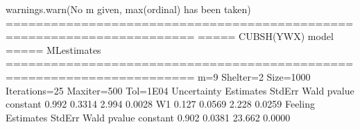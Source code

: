 \documentclass[letterpaper,10pt,english]{sphinxmanual}
\begin{document}
\begin{sphinxVerbatim}[commandchars=\\\{\}]
warnings.warn(\PYGZdq{}No m given, max(ordinal) has been taken\PYGZdq{})
=======================================================================
=====\PYGZgt{}\PYGZgt{}\PYGZgt{} CUBSH(YWX) model \PYGZlt{}\PYGZlt{}\PYGZlt{}===== ML\PYGZhy{}estimates
=======================================================================
m=9  Shelter=2  Size=1000  Iterations=25  Maxiter=500  Tol=1E\PYGZhy{}04
\PYGZhy{}\PYGZhy{}\PYGZhy{}\PYGZhy{}\PYGZhy{}\PYGZhy{}\PYGZhy{}\PYGZhy{}\PYGZhy{}\PYGZhy{}\PYGZhy{}\PYGZhy{}\PYGZhy{}\PYGZhy{}\PYGZhy{}\PYGZhy{}\PYGZhy{}\PYGZhy{}\PYGZhy{}\PYGZhy{}\PYGZhy{}\PYGZhy{}\PYGZhy{}\PYGZhy{}\PYGZhy{}\PYGZhy{}\PYGZhy{}\PYGZhy{}\PYGZhy{}\PYGZhy{}\PYGZhy{}\PYGZhy{}\PYGZhy{}\PYGZhy{}\PYGZhy{}\PYGZhy{}\PYGZhy{}\PYGZhy{}\PYGZhy{}\PYGZhy{}\PYGZhy{}\PYGZhy{}\PYGZhy{}\PYGZhy{}\PYGZhy{}\PYGZhy{}\PYGZhy{}\PYGZhy{}\PYGZhy{}\PYGZhy{}\PYGZhy{}\PYGZhy{}\PYGZhy{}\PYGZhy{}\PYGZhy{}\PYGZhy{}\PYGZhy{}\PYGZhy{}\PYGZhy{}\PYGZhy{}\PYGZhy{}\PYGZhy{}\PYGZhy{}\PYGZhy{}\PYGZhy{}\PYGZhy{}\PYGZhy{}\PYGZhy{}\PYGZhy{}\PYGZhy{}\PYGZhy{}
Uncertainty
          Estimates  StdErr     Wald  p\PYGZhy{}value
constant      0.992  0.3314    2.994   0.0028
W1           \PYGZhy{}0.127  0.0569   \PYGZhy{}2.228   0.0259
\PYGZhy{}\PYGZhy{}\PYGZhy{}\PYGZhy{}\PYGZhy{}\PYGZhy{}\PYGZhy{}\PYGZhy{}\PYGZhy{}\PYGZhy{}\PYGZhy{}\PYGZhy{}\PYGZhy{}\PYGZhy{}\PYGZhy{}\PYGZhy{}\PYGZhy{}\PYGZhy{}\PYGZhy{}\PYGZhy{}\PYGZhy{}\PYGZhy{}\PYGZhy{}\PYGZhy{}\PYGZhy{}\PYGZhy{}\PYGZhy{}\PYGZhy{}\PYGZhy{}\PYGZhy{}\PYGZhy{}\PYGZhy{}\PYGZhy{}\PYGZhy{}\PYGZhy{}\PYGZhy{}\PYGZhy{}\PYGZhy{}\PYGZhy{}\PYGZhy{}\PYGZhy{}\PYGZhy{}\PYGZhy{}\PYGZhy{}\PYGZhy{}\PYGZhy{}\PYGZhy{}\PYGZhy{}\PYGZhy{}\PYGZhy{}\PYGZhy{}\PYGZhy{}\PYGZhy{}\PYGZhy{}\PYGZhy{}\PYGZhy{}\PYGZhy{}\PYGZhy{}\PYGZhy{}\PYGZhy{}\PYGZhy{}\PYGZhy{}\PYGZhy{}\PYGZhy{}\PYGZhy{}\PYGZhy{}\PYGZhy{}\PYGZhy{}\PYGZhy{}\PYGZhy{}\PYGZhy{}
Feeling
          Estimates  StdErr     Wald  p\PYGZhy{}value
constant     \PYGZhy{}0.902  0.0381  \PYGZhy{}23.662   0.0000
\PYGZhy{}\PYGZhy{}\PYGZhy{}\PYGZhy{}\PYGZhy{}\PYGZhy{}\PYGZhy{}\PYGZhy{}\PYGZhy{}\PYGZhy{}\PYGZhy{}\PYGZhy{}\PYGZhy{}\PYGZhy{}\PYGZhy{}\PYGZhy{}\PYGZhy{}\PYGZhy{}\PYGZhy{}\PYGZhy{}\PYGZhy{}\PYGZhy{}\PYGZhy{}\PYGZhy{}\PYGZhy{}\PYGZhy{}\PYGZhy{}\PYGZhy{}\PYGZhy{}\PYGZhy{}\PYGZhy{}\PYGZhy{}\PYGZhy{}\PYGZhy{}\PYGZhy{}\PYGZhy{}\PYGZhy{}\PYGZhy{}\PYGZhy{}\PYGZhy{}\PYGZhy{}\PYGZhy{}\PYGZhy{}\PYGZhy{}\PYGZhy{}\PYGZhy{}\PYGZhy{}\PYGZhy{}\PYGZhy{}\PYGZhy{}\PYGZhy{}\PYGZhy{}\PYGZhy{}\PYGZhy{}\PYGZhy{}\PYGZhy{}\PYGZhy{}\PYGZhy{}\PYGZhy{}\PYGZhy{}\PYGZhy{}\PYGZhy{}\PYGZhy{}\PYGZhy{}\PYGZhy{}\PYGZhy{}\PYGZhy{}\PYGZhy{}\PYGZhy{}\PYGZhy{}\PYGZhy{}

\end{sphinxVerbatim}
\end{document}
